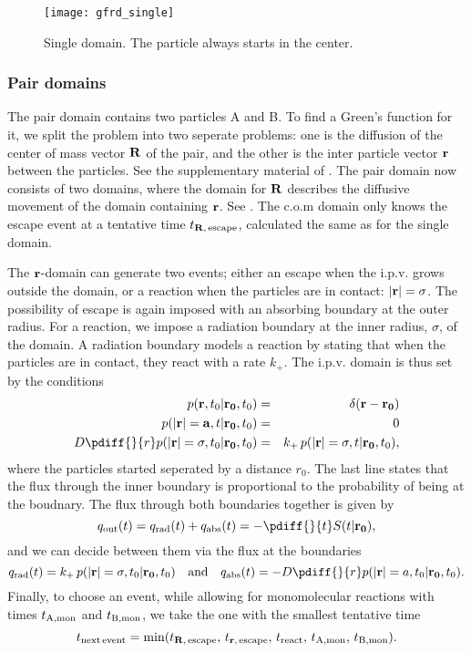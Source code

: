 \begin{figure}[bh]
\centering
\texttt{[image: gfrd\_single]}
\caption{ Single domain. The particle always starts in the center.}
\end{figure}


\subsubsection{Pair domains}
The pair domain contains two particles A and B. To find a Green's function for it, we split the problem into two seperate problems: one is the diffusion of the center of mass vector ${\bf R}$ of the pair, and the other is the inter particle vector ${\bf r}$ between the particles. See the supplementary material of \cite{Takahashi2010}. The pair domain now consists of two domains, where the domain for ${\bf R}$ describes the diffusive movement of the domain containing ${\bf r}$. See . The c.o.m domain only knows the escape event at a tentative time $t_{{\bf R},\,{\rm escape}}$, calculated the same as for the single domain. 

The ${\bf r}$-domain can generate two events; either an escape when the i.p.v. grows outside the domain, or a reaction when the particles are in contact: ${\bf |r|}=\sigma$. The possibility of escape is again imposed with an absorbing boundary at the outer radius. For a reaction, we impose a radiation boundary at the inner radius, $\sigma$, of the domain. A radiation boundary models a reaction by stating that when the particles are in contact, they react with a rate $k_+$. The i.p.v. domain is thus set by the conditions
\setlength{\jot}{10pt}
\begin{eqnarray}
 p({\bf r}, t_0|{\bf r_0},t_0) & = & \delta(\mathbf{r - r_0}) \\
 p({\bf |r|=a}, t|{\bf r_0},t_0) & = & 0 \\
 D \pdiff{}{r} p({\bf |r|}=\sigma, t_0|{\bf r_0},t_0) & = & k_+\,p({\bf |r|}=\sigma, t|{\bf r_0},t_0),
\end{eqnarray}
where the particles started seperated by a distance $r_0$. The last line states that the flux through the inner boundary is proportional to the probability of being at the boudnary. The flux through both boundaries together is given by
\begin{equation}
 q_{\rm out}(t) = q_{\rm rad}(t) + q_{\rm abs}(t) = -\pdiff{}{t} S(t|{\bf r_0}),
\end{equation}
and we can decide between them via the flux at the boundaries
\begin{equation}
q_{\rm rad}(t) = k_+ \, p({\bf |r|}=\sigma, t_0|{\bf r_0},t_0) \quad{\rm and}\quad q_{\rm abs}(t) = - D \pdiff{}{r} p({\bf |r|}=a, t_0|{\bf r_0},t_0).
\end{equation}
Finally, to choose an event, while allowing for monomolecular reactions with times $t_{\rm A, mon}$ and $t_{\rm B, mon}$, we take the one with the smallest tentative time
\begin{equation}
 t_{\rm next\,event} = {\rm min}(t_{{\bf R},\,{\rm escape}},\,t_{{\bf r},\,{\rm escape}},\,t_{\rm react},\,t_{\rm A, mon},\,t_{\rm B, mon}).
\end{equation}

